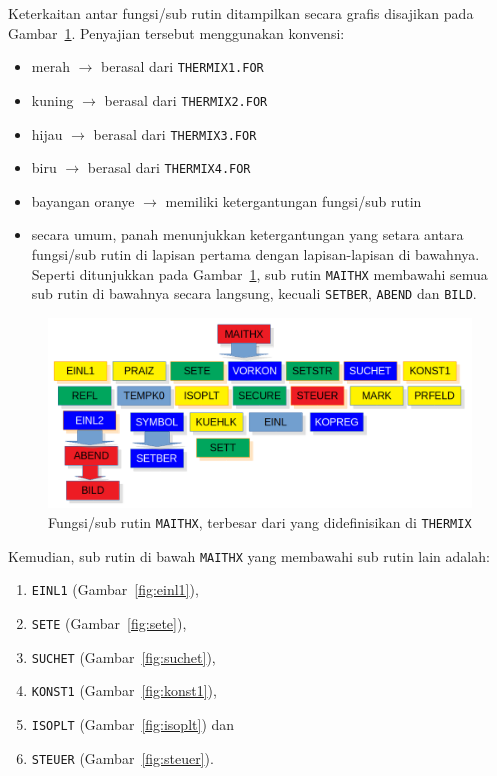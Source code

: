 \documentclass[a4paper,11pt]{report}
\renewcommand{\figurename}{Gambar}
\begin{document}
Keterkaitan antar fungsi/sub rutin ditampilkan secara grafis disajikan pada \figurename~\ref{fig:maithx}. Penyajian tersebut menggunakan konvensi:
\begin{itemize}
  \item merah $\rightarrow$ berasal dari \texttt{THERMIX1.FOR}
  \item kuning $\rightarrow$ berasal dari \texttt{THERMIX2.FOR}
  \item hijau $\rightarrow$ berasal dari \texttt{THERMIX3.FOR}
  \item biru $\rightarrow$ berasal dari \texttt{THERMIX4.FOR}
  \item bayangan oranye $\rightarrow$ memiliki ketergantungan fungsi/sub rutin
  \item secara umum, panah menunjukkan ketergantungan yang setara antara fungsi/sub rutin di lapisan pertama dengan lapisan-lapisan di bawahnya. Seperti ditunjukkan pada \figurename~\ref{fig:maithx}, sub rutin \texttt{MAITHX} membawahi semua sub rutin di bawahnya secara langsung, kecuali \texttt{SETBER}, \texttt{ABEND} dan \texttt{BILD}.
\end{itemize}

\begin{figure}
  \begin{center}
    \includegraphics[scale=.5]{../maithx.png}
    \caption{Fungsi/sub rutin \texttt{MAITHX}, terbesar dari yang didefinisikan di \texttt{THERMIX}}
    \label{fig:maithx}
  \end{center}
\end{figure}

\vspace*{1cm}
Kemudian, sub rutin di bawah \texttt{MAITHX} yang membawahi sub rutin lain adalah:
\begin{enumerate}
  \item \texttt{EINL1} (\figurename~\ref{fig:einl1}),
  \item \texttt{SETE} (\figurename~\ref{fig:sete}),
  \item \texttt{SUCHET} (\figurename~\ref{fig:suchet}),
  \item \texttt{KONST1} (\figurename~\ref{fig:konst1}),
  \item \texttt{ISOPLT} (\figurename~\ref{fig:isoplt}) dan
  \item \texttt{STEUER} (\figurename~\ref{fig:steuer}).
\end{enumerate}
        
\end{document}
